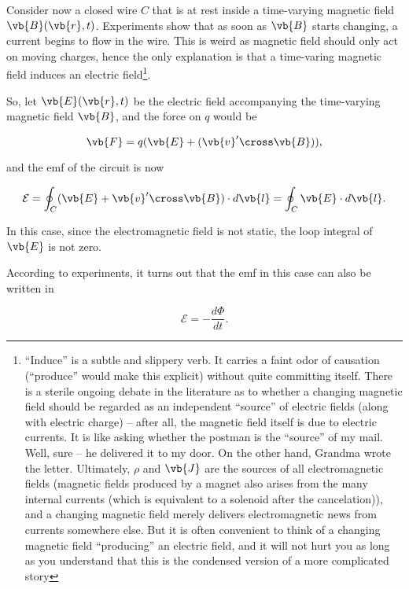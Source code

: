 \documentclass[english,a4paper,12pt]{report}
\begin{document}
Consider now a closed wire \(C\) that is at rest inside a time-varying magnetic field \(\vb{B} (\vb{r} ,t)\). Experiments show that as soon as \(\vb{B} \) starts changing, a current begins to flow in the wire. This is weird as magnetic field should only act on moving charges, hence the only explanation is that a time-varing magnetic field induces an electric field\footnote{``Induce'' is a subtle and slippery verb. It carries a faint odor of causation (“produce” would make this explicit) without quite committing itself. There is a sterile ongoing debate in the literature as to whether a changing magnetic field should be regarded as an independent “source” of electric fields (along with electric charge) -- after all, the magnetic field itself is due to electric currents. It is like asking whether the postman is the “source” of my mail. Well, sure -- he delivered it to my door. On the other hand, Grandma wrote the letter. Ultimately, \(\rho \)  and \(\vb{J} \)  are the sources of all electromagnetic fields (magnetic fields produced by a magnet also arises from the many internal currents (which is equivalent to a solenoid after the cancelation)), and a changing magnetic field merely delivers electromagnetic news from currents somewhere else. But it is often convenient to think of a changing magnetic field “producing” an electric field, and it will not hurt you as long as you understand that this is the condensed version of a more complicated story}. 
 
So, let \(\vb{E} (\vb{r} ,t)\) be the electric field accompanying the time-varying magnetic field \(\vb{B} \), and the force on \(q\) would be

\begin{equation}
    \vb{F}  = q(\vb{E} + (\vb{v}' \cross \vb{B} )),
\end{equation}

and the emf of the circuit is now

\begin{equation}
    \mathcal{E} = \oint_{C} (\vb{E} + \vb{v} ' \cross \vb{B} ) \cdot d \vb{l} = \oint_{C} \vb{E} \cdot d \vb{l} . 
\end{equation}

In this case, since the electromagnetic field is not static, the loop integral of \(\vb{E} \) is not zero.

According to experiments, it turns out that the emf in this case can also be written in

\begin{equation}
    \mathcal{E}= - \frac{d\Phi }{dt}.
\end{equation}
\end{document}
